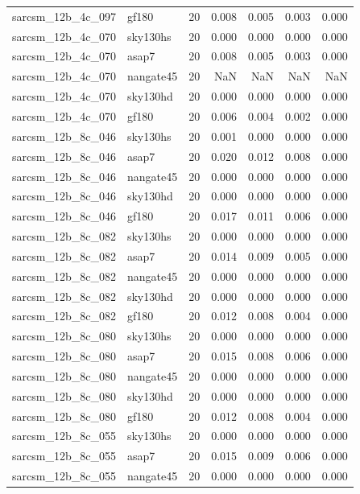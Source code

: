 \begin{tabular}{llrrrrr}
sarcsm\_12b\_4c\_097 & gf180 & 20 & 0.008 & 0.005 & 0.003 & 0.000 \\
sarcsm\_12b\_4c\_070 & sky130hs & 20 & 0.000 & 0.000 & 0.000 & 0.000 \\
sarcsm\_12b\_4c\_070 & asap7 & 20 & 0.008 & 0.005 & 0.003 & 0.000 \\
sarcsm\_12b\_4c\_070 & nangate45 & 20 & NaN & NaN & NaN & NaN \\
sarcsm\_12b\_4c\_070 & sky130hd & 20 & 0.000 & 0.000 & 0.000 & 0.000 \\
sarcsm\_12b\_4c\_070 & gf180 & 20 & 0.006 & 0.004 & 0.002 & 0.000 \\
sarcsm\_12b\_8c\_046 & sky130hs & 20 & 0.001 & 0.000 & 0.000 & 0.000 \\
sarcsm\_12b\_8c\_046 & asap7 & 20 & 0.020 & 0.012 & 0.008 & 0.000 \\
sarcsm\_12b\_8c\_046 & nangate45 & 20 & 0.000 & 0.000 & 0.000 & 0.000 \\
sarcsm\_12b\_8c\_046 & sky130hd & 20 & 0.000 & 0.000 & 0.000 & 0.000 \\
sarcsm\_12b\_8c\_046 & gf180 & 20 & 0.017 & 0.011 & 0.006 & 0.000 \\
sarcsm\_12b\_8c\_082 & sky130hs & 20 & 0.000 & 0.000 & 0.000 & 0.000 \\
sarcsm\_12b\_8c\_082 & asap7 & 20 & 0.014 & 0.009 & 0.005 & 0.000 \\
sarcsm\_12b\_8c\_082 & nangate45 & 20 & 0.000 & 0.000 & 0.000 & 0.000 \\
sarcsm\_12b\_8c\_082 & sky130hd & 20 & 0.000 & 0.000 & 0.000 & 0.000 \\
sarcsm\_12b\_8c\_082 & gf180 & 20 & 0.012 & 0.008 & 0.004 & 0.000 \\
sarcsm\_12b\_8c\_080 & sky130hs & 20 & 0.000 & 0.000 & 0.000 & 0.000 \\
sarcsm\_12b\_8c\_080 & asap7 & 20 & 0.015 & 0.008 & 0.006 & 0.000 \\
sarcsm\_12b\_8c\_080 & nangate45 & 20 & 0.000 & 0.000 & 0.000 & 0.000 \\
sarcsm\_12b\_8c\_080 & sky130hd & 20 & 0.000 & 0.000 & 0.000 & 0.000 \\
sarcsm\_12b\_8c\_080 & gf180 & 20 & 0.012 & 0.008 & 0.004 & 0.000 \\
sarcsm\_12b\_8c\_055 & sky130hs & 20 & 0.000 & 0.000 & 0.000 & 0.000 \\
sarcsm\_12b\_8c\_055 & asap7 & 20 & 0.015 & 0.009 & 0.006 & 0.000 \\
sarcsm\_12b\_8c\_055 & nangate45 & 20 & 0.000 & 0.000 & 0.000 & 0.000 \\

\end{tabular}
